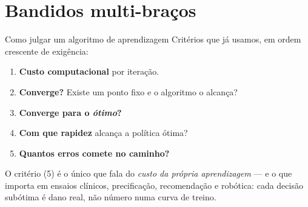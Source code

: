 \documentclass[aspectratio=169, 10pt]{beamer}
\begin{document}
\section{Bandidos multi-braços}

\begin{frame}{Como julgar um algoritmo de aprendizagem}
  Critérios que já usamos, em ordem crescente de exigência:
  \begin{enumerate}
    \item \textbf{Custo computacional} por iteração.
    \item \textbf{Converge?} Existe um ponto fixo e o algoritmo o alcança?
    \item \textbf{Converge para o \emph{ótimo}?}
    \item \textbf{Com que rapidez} alcança a política ótima?
    \item \alert{\textbf{Quantos erros comete no caminho?}}
  \end{enumerate}

  \bigskip
  \begin{alertabox}
    O critério (5) é o único que fala do \emph{custo da própria
    aprendizagem} — e o que importa em ensaios clínicos, precificação,
    recomendação e robótica: cada decisão subótima é dano real, não número
    numa curva de treino.
  \end{alertabox}
\end{frame}
\end{document}
